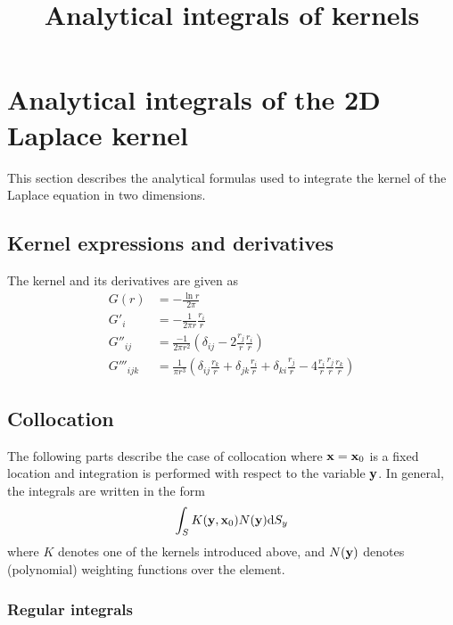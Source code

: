 \documentclass[a4paper,11pt]{article}
\title {Analytical integrals of kernels}
\newcommand{\td}{\mathrm{d}}
\begin{document}
\maketitle

\tableofcontents

\section{Analytical integrals of the 2D Laplace kernel}

This section describes the analytical formulas used to integrate the kernel of the Laplace equation in two dimensions.

\subsection{Kernel expressions and derivatives}

The kernel and its derivatives are given as
%
\begin{align}
	G(r)
	&= -\frac{\ln r}{2\pi} \\
	G'_{i}
	&= -\frac{1}{2\pi r} \frac{r_i}{r}
	\label{eq:laplace_gradient}
	\\
	G''_{ij}
	&= \frac{-1}{2\pi r^2}\left( \delta_{ij} - 2\frac{r_j}{r} \frac{r_i}{r}\right)
	\label{eq:laplace_second_derivative}
	\\
	G'''_{ijk}
	&= \frac{1}{\pi r^3} \left(
	\delta_{ij} \frac{r_k}{r}
	+ \delta_{jk} \frac{r_i}{r}
	+ \delta_{ki} \frac{r_j}{r}
	-4 \frac{r_i}{r} \frac{r_j}{r} \frac{r_k}{r}
	\right)
	\label{eq:laplace_third_derivative}
\end{align}



\subsection{Collocation}

The following parts describe the case of collocation where ${\bf x}={\bf x}_0$ is a fixed location and integration is performed with respect to the variable ${\bf y}$. In general, the integrals are written in the form
%
\begin{equation}
\int_S K({\bf y}, {\bf x}_0) N({\bf y}) \td S_y
\end{equation}
%
where $K$ denotes one of the kernels introduced above, and $N({\bf y})$ denotes (polynomial) weighting functions over the element.

\subsubsection{Regular integrals}
\end{document}
